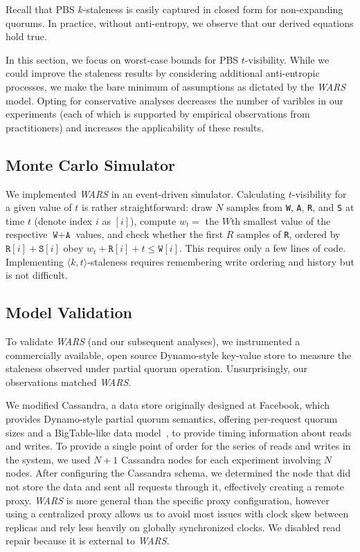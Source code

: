 \documentclass{vldb}
\newcommand{\subsectionskip}{-0em}
\begin{document}
Recall that PBS $k$-staleness is easily captured in closed form for
non-expanding quorums.  In practice, without anti-entropy, we observe
that our derived equations hold true.

In this section, we focus on worst-case bounds for PBS $t$-visibility.  While
we could improve the staleness results by considering additional
anti-entropic processes, we make the bare minimum of assumptions as
dictated by the \textit{WARS}  model.  Opting for conservative analyses
decreases the number of varibles in our experiments (each of which is
supported by empirical observations from practitioners) and increases
the applicability of these results.

\vspace{\subsectionskip}\subsection{Monte Carlo Simulator}

We implemented \textit{WARS} in an event-driven simulator.
Calculating $t$-visibility for a given value of $t$ is rather
straightforward: draw $N$ samples from \texttt{W}, \texttt{A},
\texttt{R}, and \texttt{S} at time $t$ (denote index $i$ as $[i]$),
compute $w_t = $ the $W$th smallest value of the respective
$\texttt{W}+\texttt{A}$ values, and check whether the first $R$
samples of \texttt{R}, ordered by $\texttt{R}[i]+\texttt{S}[i]$ obey
$w_t+\texttt{R}[i] + t\leq \texttt{W}[i]$.  This requires only a few
lines of code.  Implementing $\langle k, t \rangle$-staleness requires
remembering write ordering and history but is not difficult.

\vspace{\subsectionskip}\subsection{Model Validation}

To validate \textit{WARS}  (and our subsequent analyses), we instrumented a
commercially available, open source Dynamo-style key-value store to
measure the staleness observed under partial quorum operation.
Unsurprisingly, our observations matched \textit{WARS}.

We modified Cassandra, a data store originally designed at Facebook,
which provides Dynamo-style partial quorum semantics, offering
per-request quorum sizes and a BigTable-like data
model~\cite{cassandra, cassandra-sigmod}, to provide timing
information about reads and writes.  To provide a single point of
order for the series of reads and writes in the system, we used $N+1$
Cassandra nodes for each experiment involving $N$ nodes.  After
configuring the Cassandra schema, we determined the node that did not
store the data and sent all requests through it, effectively creating
a remote proxy.  \textit{WARS} is more general than the specific proxy
configuration, however using a centralized proxy allows us to avoid
most issues with clock skew between replicas and rely less heavily on
globally synchronized clocks.  We disabled read repair because it is
external to \textit{WARS}.
\end{document}
